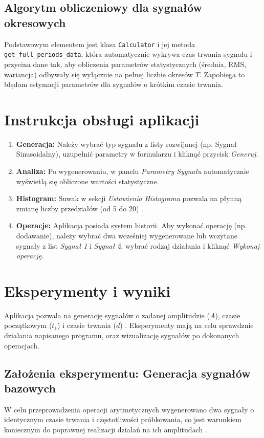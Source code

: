 \documentclass[12pt]{article}
\begin{document}
\subsection{Algorytm obliczeniowy dla sygnałów okresowych}
Podstawowym elementem jest klasa \texttt{Calculator} i jej metoda \texttt{get\_full\_periods\_data}, która automatycznie wykrywa czas trwania sygnału i przycina dane tak, aby obliczenia parametrów statystycznych (średnia, RMS, wariancja) odbywały się wyłącznie na pełnej liczbie okresów $T$. Zapobiega to błędom estymacji parametrów dla sygnałów o krótkim czasie trwania.

\section{Instrukcja obsługi aplikacji}
\begin{enumerate}
    \item \textbf{Generacja:} Należy wybrać typ sygnału z listy rozwijanej (np. Sygnał Sinusoidalny), uzupełnić parametry w formularzu i kliknąć przycisk \textit{Generuj}.
    \item \textbf{Analiza:} Po wygenerowaniu, w panelu \textit{Parametry Sygnału} automatycznie wyświetlą się obliczone wartości statystyczne.
    \item \textbf{Histogram:} Suwak w sekcji \textit{Ustawienia Histogramu} pozwala na płynną zmianę liczby przedziałów (od 5 do 20) \cite{1}.
    \item \textbf{Operacje:} Aplikacja posiada system historii. Aby wykonać operację (np. dodawanie), należy wybrać dwa wcześniej wygenerowane lub wczytane sygnały z list \textit{Sygnał 1} i \textit{Sygnał 2}, wybrać rodzaj działania i kliknąć \textit{Wykonaj operację}.
\end{enumerate}

\section{Eksperymenty i wyniki}
Aplikacja pozwala na generację sygnałów o zadanej amplitudzie ($A$), czasie początkowym ($t_1$) i czasie trwania ($d$) \cite{1}. Eksperymenty mają na celu sprawdznie działania napisanego programu, oraz wizualizację sygnałów po dokonanych operacjach.

\subsection{Założenia eksperymentu: Generacja sygnałów bazowych}
W celu przeprowadzenia operacji arytmetycznych wygenerowano dwa sygnały o identycznym czasie trwania i częstotliwości próbkowania, co jest warunkiem koniecznym do poprawnej realizacji działań na ich amplitudach \cite{1}.
\end{document}
